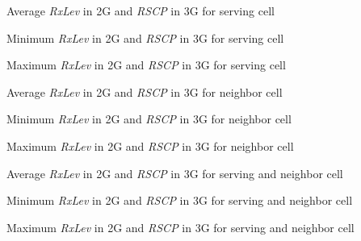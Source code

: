 %
{Average \textit{RxLev} in 2G and \textit{RSCP} in 3G for serving cell}

%
{Minimum \textit{RxLev} in 2G and \textit{RSCP} in 3G  for serving cell}

%
{Maximum \textit{RxLev} in 2G and \textit{RSCP} in 3G for serving cell}


%
{Average \textit{RxLev} in 2G and \textit{RSCP} in 3G for neighbor cell}

%
{Minimum \textit{RxLev} in 2G and \textit{RSCP} in 3G  for neighbor cell}

%
{Maximum \textit{RxLev} in 2G and \textit{RSCP} in 3G for neighbor cell}


%
{Average \textit{RxLev} in 2G and \textit{RSCP} in 3G for serving and neighbor cell}

%
{Minimum \textit{RxLev} in 2G and \textit{RSCP} in 3G for serving and neighbor cell}

%
{Maximum \textit{RxLev} in 2G and \textit{RSCP} in 3G for serving and neighbor cell}

